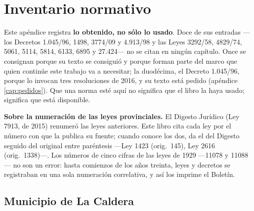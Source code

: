 \chapter{Inventario normativo}

\begin{cautela}
Este apéndice registra \textbf{lo obtenido, no sólo lo usado}. Doce de sus entradas ---los Decretos 1.045/96, 1498, 3774/09 y 4.913/98 y las Leyes 3292/58, 4829/74, 5061, 5114, 5814, 6133, 6895 y 27.424--- no se citan en ningún capítulo. Once se consignan porque su texto se consiguió y porque forman parte del marco que quien continúe este trabajo va a necesitar; la duodécima, el Decreto 1.045/96, porque lo invocan tres resoluciones de 2016, y su texto está pedido (apéndice \ref{cap:pedidos}). Que una norma esté aquí no significa que el libro la haya usado; significa que está disponible.

\textbf{Sobre la numeración de las leyes provinciales.} El Digesto Jurídico (Ley 7913, de 2015) renumeró las leyes anteriores. Este libro cita cada ley por el número con que la publica su fuente; cuando conoce los dos, da el del Digesto seguido del original entre paréntesis ---Ley 1423 (orig.\ 145), Ley 2616 (orig.\ 1338)---. Los números de cinco cifras de las leyes de 1929 ---11078 y 11088--- no son un error: hasta comienzos de los años treinta, leyes y decretos se registraban en una sola numeración correlativa, y así los imprime el Boletín.
\end{cautela}

\label{cap:normativa}
\section*{Municipio de La Caldera}

